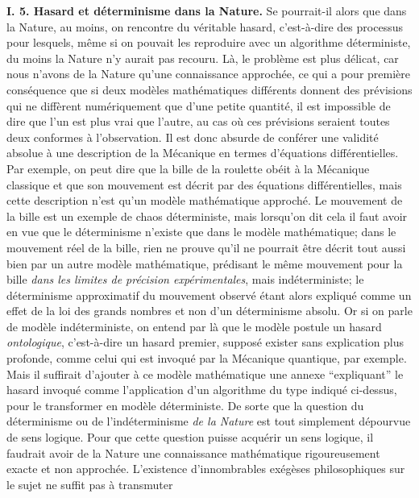 {\bf I. 5. Hasard et d\'eterminisme dans la Nature.} 
\medskip 
Se pourrait-il alors que dans la Nature, au moins, on rencontre du 
v\'eritable hasard, c'est-\`a-dire des processus pour lesquels, m\^eme si 
on pouvait les reproduire avec un algorithme d\'eterministe, du moins la 
Nature n'y aurait pas recouru. L\`a, le probl\`eme est plus d\'elicat, car 
nous n'avons de la Nature qu'une connaissance approch\'ee, ce qui a pour 
premi\`ere cons\'equence que si deux mod\`eles math\'ematiques 
diff\'erents  donnent des pr\'evisions qui ne diff\`erent num\'eriquement 
que d'une petite quantit\'e, il est impossible de dire que l'un est plus vrai 
que l'autre, au cas o\`u ces pr\'evisions seraient toutes deux conformes 
\`a l'observation. Il est donc absurde de conf\'erer une validit\'e absolue  
\`a une description de la M\'ecanique en termes d'\'equations 
diff\'erentielles. Par exemple, on peut dire que la bille de la roulette 
ob\'eit \`a la M\'ecanique classique et que son mouvement est d\'ecrit 
par des \'equations diff\'erentielles, mais cette description n'est qu'un 
mod\`ele math\'ematique approch\'e. Le mouvement de la bille est un 
exemple de chaos d\'eterministe, mais lorsqu'on dit cela il faut avoir  
en vue que le d\'eterminisme n'existe que dans le mod\`ele 
math\'ematique; dans le mouvement r\'eel de la bille, rien ne prouve  
qu'il ne pourrait \^etre d\'ecrit tout aussi bien par un autre mod\`ele 
math\'ematique, pr\'edisant le m\^eme mouvement pour la bille {\it dans 
les limites de pr\'ecision exp\'erimentales}, mais ind\'eterministe; le 
d\'eterminisme appro\-xi\-matif du mouvement observ\'e \'etant alors  
expliqu\'e comme un effet de la loi des grands nombres et non d'un 
d\'eterminisme absolu. Or si on parle de mod\`ele ind\'eterministe, on 
entend par l\`a que le mod\`ele postule un hasard {\it ontologique}, 
c'est-\`a-dire un hasard premier, suppos\'e exister sans explication plus 
profonde, comme celui qui est invoqu\'e par la M\'ecanique quantique, par 
exemple. Mais il suffirait d'ajouter \`a ce mod\`ele math\'ematique une 
annexe ``expliquant'' le hasard invoqu\'e comme l'application d'un 
algorithme du type indiqu\'e ci-dessus, pour  le transformer en mod\`ele 
d\'eterministe. De sorte que la question du d\'eterminisme ou de 
l'ind\'eterminisme {\it de la Nature} est tout simplement d\'epourvue de 
sens logique. Pour que cette question puisse acqu\'erir un sens logique,  
il faudrait avoir de la Nature une connaissance math\'ematique 
rigoureusement exacte et non approch\'ee. L'existence d'innombrables 
ex\'eg\`eses philosophiques sur le sujet ne suffit pas \`a transmuter  
